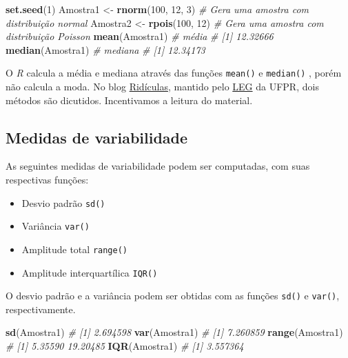 \documentclass[
]{book}
\newenvironment{Shaded}{\begin{snugshade}}{\end{snugshade}}
\newcommand{\CommentTok}[1]{\textcolor[rgb]{0.56,0.35,0.01}{\textit{#1}}}
\newcommand{\DecValTok}[1]{\textcolor[rgb]{0.00,0.00,0.81}{#1}}
\newcommand{\KeywordTok}[1]{\textcolor[rgb]{0.13,0.29,0.53}{\textbf{#1}}}
\newcommand{\NormalTok}[1]{#1}
\newcommand{\StringTok}[1]{\textcolor[rgb]{0.31,0.60,0.02}{#1}}
\providecommand{\tightlist}{%
  \setlength{\itemsep}{0pt}\setlength{\parskip}{0pt}}
\begin{document}
\begin{Shaded}
\begin{Highlighting}[]
\KeywordTok{set.seed}\NormalTok{(}\DecValTok{1}\NormalTok{)}
\NormalTok{Amostra1 <-}\StringTok{ }\KeywordTok{rnorm}\NormalTok{(}\DecValTok{100}\NormalTok{, }\DecValTok{12}\NormalTok{, }\DecValTok{3}\NormalTok{) }\CommentTok{# Gera uma amostra com distribuição normal}
\NormalTok{Amostra2 <-}\StringTok{ }\KeywordTok{rpois}\NormalTok{(}\DecValTok{100}\NormalTok{, }\DecValTok{12}\NormalTok{) }\CommentTok{# Gera uma amostra com distribuição Poisson}
\KeywordTok{mean}\NormalTok{(Amostra1) }\CommentTok{# média}
\CommentTok{# [1] 12.32666}
\KeywordTok{median}\NormalTok{(Amostra1) }\CommentTok{# mediana}
\CommentTok{# [1] 12.34173}
\end{Highlighting}
\end{Shaded}

O \emph{R} calcula a média  e mediana  através das funções \texttt{mean()}  e \texttt{median()} , porém não calcula a moda. No blog \href{https://ridiculas.wordpress.com/2011/11/18/moda-de-uma-amostra-metodo-do-histograma-vs-metodo-kernel/}{Ridículas}, mantido pelo \href{http://www.leg.ufpr.br/doku.php/start}{LEG} da UFPR, dois métodos são dicutidos. Incentivamos a leitura do material.

\hypertarget{medidas-de-variabilidade}{%
\subsection{Medidas de variabilidade}\label{medidas-de-variabilidade}}

As seguintes medidas de variabilidade podem ser computadas, com suas respectivas funções:

\begin{itemize}
\tightlist
\item
  Desvio padrão \texttt{sd()}
\item
  Variância \texttt{var()}
\item
  Amplitude total \texttt{range()}
\item
  Amplitude interquartílica \texttt{IQR()}
\end{itemize}

O desvio padrão e a variância podem ser obtidas com as funções \texttt{sd()}  e \texttt{var()}, respectivamente. 

\begin{Shaded}
\begin{Highlighting}[]
\KeywordTok{sd}\NormalTok{(Amostra1)}
\CommentTok{# [1] 2.694598}
\KeywordTok{var}\NormalTok{(Amostra1)}
\CommentTok{# [1] 7.260859}
\KeywordTok{range}\NormalTok{(Amostra1)}
\CommentTok{# [1]  5.35590 19.20485}
\KeywordTok{IQR}\NormalTok{(Amostra1)}
\CommentTok{# [1] 3.557364}
\end{Highlighting}
\end{Shaded}
\end{document}
